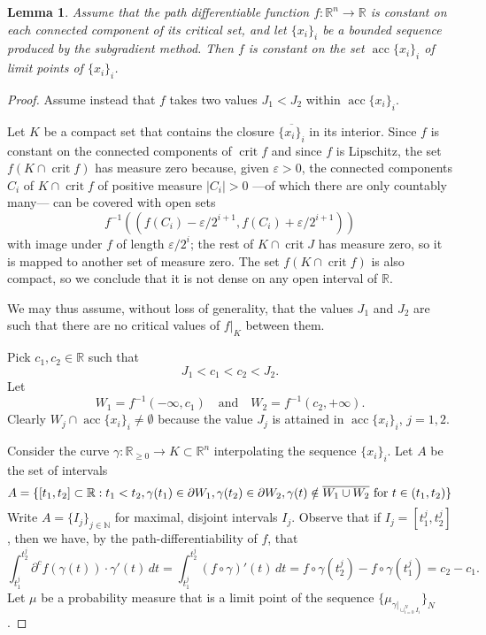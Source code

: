 \documentclass[11pt]{article}
\newtheorem{lem}[thm]{Lemma}
\theoremstyle{definition}
\theoremstyle{remark}
\newcommand{\R}{\mathbb{R}}
\newcommand{\N}{\mathbb{N}}
\renewcommand{\geq}{\geqslant}
\newcommand{\meas}[2]{\mu_{#1|_{#2}}}
\begin{document}
 
\begin{lem}\label{lem:acc}
 Assume that the path differentiable function $f\colon\R^n\to\R$ is constant on each connected component of its critical set, and let $\{x_i\}_i$ be a bounded sequence produced by the subgradient method. Then $f$ is constant on the set $\operatorname{acc}\{x_i\}_i$ of limit points of $\{x_i\}_i$.
\end{lem}
\begin{proof}
 Assume instead that $f$ takes two values $J_1<J_2$ within $\operatorname{acc}\{x_i\}_i$. 
 
 Let $K$ be a compact set that contains the closure $\overline{\{x_i\}_i}$ in its interior. %
 Since $f$ is constant on the connected components of $\operatorname{crit}f$ and since $f$ is Lipschitz, the set $f(K\cap\operatorname{crit}f)$ has measure zero because, given $\varepsilon>0$, the connected components $C_i$ of $K\cap\operatorname{crit}f$ of positive measure $|C_i|>0$ ---of which there are only countably many--- can be covered with open sets \[f^{-1}((f(C_i)-\varepsilon/2^{i+1},f(C_i)+\varepsilon/2^{i+1}))\] 
 with image under $f$ of length $\varepsilon/2^i$; the rest of $K\cap\operatorname{crit} J$ has measure zero, so it is mapped to another set of measure zero. The set $f(K\cap\operatorname{crit}f)$ is also compact, so we conclude that it is not dense on any open interval of $\R$. 
 
 We may thus assume, without loss of generality, that the values $J_1$ and $J_2$ are such that there are no critical values of $f|_K$ between them.
 
 Pick $c_1,c_2\in\R$ such that
 \[J_1<c_1<c_2<J_2.\]
 Let 
 \[W_1=f^{-1}(-\infty,c_1)\quad\textrm{and}\quad W_2=f^{-1}(c_2,+\infty).\]
 Clearly $W_j\cap\operatorname{acc}\{x_i\}_i\neq\emptyset$ because the value $J_j$ is attained in $\operatorname{acc}\{x_i\}_i$, $j=1,2$. 
 
 Consider the curve $\gamma\colon\R_{\geq0}\to K\subset\R^n$ interpolating the sequence $\{x_i\}_i$. Let $A$ be the set of intervals
 \begin{equation*}
  A=\{[t_1,t_2]\subset\R:t_1<t_2,\gamma(t_1)\in\partial W_1,\gamma(t_2)\in \partial W_2,\\ 
  \textrm{$\gamma(t)\notin \overline{W_1\cup W_2}$ for $t\in (t_1,t_2)$}\}
 \end{equation*}
 Write $A=\{I_j\}_{j\in\N}$ for maximal, disjoint intervals $I_j$.
 Observe that if $I_j=[t_1^j,t_2^j]$, then we have, by the path-differentiability of $f$, that 
 \begin{equation}\label{eq:singleintervalint}\int_{t_1^j}^{t_2^j}\partial^c f(\gamma(t))\cdot\gamma'(t)\,dt=\int_{t_1^j}^{t_2^j}(f\circ\gamma)'(t)\,dt
 =f\circ\gamma(t_2^j)-f\circ\gamma(t_1^j)=c_2-c_1. 
 \end{equation}
 Let $\mu$ be a probability measure that is a limit point of the sequence $\{\meas{\gamma}{\cup_{i=0}^NI_i}\}_N$. 
 

\end{proof}
\end{document}
